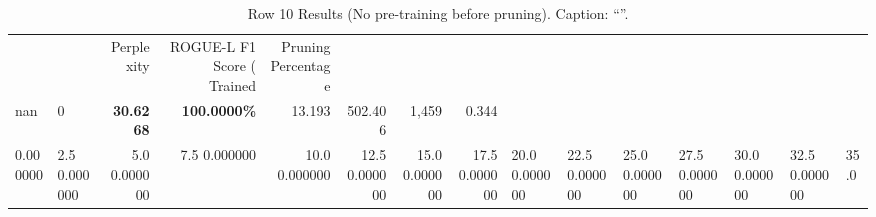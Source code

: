 \begin{table}
\caption{Row 10 Results (No pre-training before pruning). \ifshowcaption{}Caption: ``''.\fi}
\label{tab:evaluation-pipeline-10-untrained}
\begin{tabular}{llrrrrrr}
 &  & Perplexity & ROGUE-L F1 Score (%
Trained & Pruning Percentage &  &  &  &  &  &  \\
nan & 0 & \bfseries 30.6268 & \bfseries 100.0000\% & 13.193 & 502.406 & 1,459 & 0.344 \\
0.000000 & 2.5%
0.000000 & 5.0%
0.000000 & 7.5%
0.000000 & 10.0%
0.000000 & 12.5%
0.000000 & 15.0%
0.000000 & 17.5%
0.000000 & 20.0%
0.000000 & 22.5%
0.000000 & 25.0%
0.000000 & 27.5%
0.000000 & 30.0%
0.000000 & 32.5%
0.000000 & 35.0%

\end{tabular}
\end{table}
